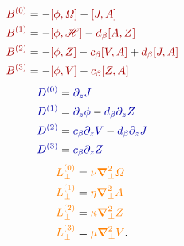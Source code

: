 \documentclass[12pt]{memoir}
\newcommand{\hfield}{\mathscr{H}}
\begin{document}
\begin{subequations}
\begin{align}
  {\color{red!65!black}B^{(0)}}  &= -{\color{red!65!black}[\phi,\Omega]}  
                                    -{\color{red!65!black}[J,A]}                                             \label{eq:ffbzero} \\
  {\color{red!65!black}B^{(1)}}  &= -{\color{red!65!black}[\phi,\hfield]}
                                    -{\color{red!65!black}d_\beta[A,Z]}                                      \label{eq:ffbone}  \\
  {\color{red!65!black}B^{(2)}}  &= -{\color{red!65!black}[\phi,Z]}       
                                    -{\color{red!65!black}c_\beta[V,A]} + {\color{red!65!black}d_\beta[J,A]} \label{eq:ffbtwo}  \\
  {\color{red!65!black}B^{(3)}}  &= -{\color{red!65!black}[\phi,V]}      
                                    -{\color{red!65!black}c_\beta[Z,A]}                                      \label{eq:ffbthree}
\end{align}
\end{subequations}
%                                   
\begin{subequations}
\begin{align}
  {\color{blue!65!black}D^{(0)}} &=  {\color{blue!65!black} \pardz J }       \label{eq:ffdzero}                       \\
  {\color{blue!65!black}D^{(1)}} &=  {\color{blue!65!black}\pardz\phi}      
                                    -{\color{blue!65!black}d_\beta\pardz Z}  \label{eq:ffdone}                        \\
  {\color{blue!65!black}D^{(2)}} &=  {\color{blue!65!black}c_\beta\pardz V} 
                                    -{\color{blue!65!black}d_\beta\pardz J}  \label{eq:ffdtwo}                        \\
  {\color{blue!65!black}D^{(3)}} &=  {\color{blue!65!black}c_\beta\pardz Z}  \label{eq:ffdthree}
\end{align}
\end{subequations}
%                                   
\begin{subequations}
\begin{align}
  {\color{orange}L^{(0)}_\perp} &= {\color{orange}\nu\boldsymbol{\nabla}_\perp^2   \Omega}    \label{eq:fflzero}                       \\
  {\color{orange}L^{(1)}_\perp} &= {\color{orange}\eta\boldsymbol{\nabla}_\perp^2   A}        \label{eq:fflone}                        \\
  {\color{orange}L^{(2)}_\perp} &= {\color{orange}\kappa\boldsymbol{\nabla}_\perp^2 Z}        \label{eq:ffltwo}                        \\
  {\color{orange}L^{(3)}_\perp} &= {\color{orange}\mu\boldsymbol{\nabla}_\perp^2    V}.       \label{eq:fflthree} 
\end{align}
\end{subequations}
\end{document}
